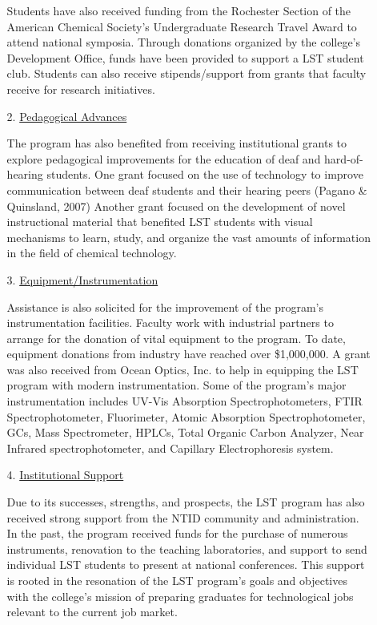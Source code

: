\documentclass[11.5pt]{sig-alternate} %
\begin{document}
\begin{large}
\begin{enumerate}[label=\Alph*)]
\begin{enumerate}
\begin{sloppypar}
        Students have also received funding from the Rochester Section of the American Chemical Society’s Undergraduate Research Travel Award to attend national symposia. Through donations organized by the college’s Development Office, funds have been provided to support a LST student club. Students can also receive stipends/support from grants that faculty receive for research initiatives. \end{sloppypar}
        \item[2.] \underline{Pedagogical Advances}
        \begin{sloppypar}The program has also benefited from receiving institutional grants to explore pedagogical improvements for the education of deaf and hard-of-hearing students. One grant focused on the use of technology to improve communication between deaf students and their hearing peers (Pagano \& Quinsland, 2007) Another grant focused on the development of novel instructional material that benefited LST students with visual mechanisms to learn, study, and organize the vast amounts of information in the field of chemical technology.\end{sloppypar}
        \item[3.] \underline{Equipment/Instrumentation}
        \begin{sloppypar}Assistance is also solicited for the improvement of the program’s instrumentation facilities. Faculty work with industrial partners to arrange for the donation of vital equipment to the program. To date, equipment donations from industry have reached over \$1,000,000. A grant was also received from Ocean Optics, Inc. to help in equipping the LST program with modern instrumentation. Some of the program’s major instrumentation includes UV-Vis Absorption Spectrophotometers, FTIR Spectrophotometer, Fluorimeter, Atomic Absorption Spectrophotometer, GCs, Mass Spectrometer, HPLCs, Total Organic Carbon Analyzer, Near Infrared spectrophotometer, and Capillary Electrophoresis system.\end{sloppypar}
        \item[4.] \underline{Institutional Support}
        \begin{sloppypar}Due to its successes, strengths, and prospects, the LST program has also received strong support from the NTID community and administration. In the past, the program received funds for the purchase of numerous instruments, renovation to the teaching laboratories, and support to send individual LST students to present at national conferences. This support is rooted in the resonation of the LST program’s goals and objectives with the college’s mission of preparing graduates for technological jobs relevant to the current job market.\end{sloppypar}

\end{enumerate}
\end{enumerate}
\end{large}
\end{document}
